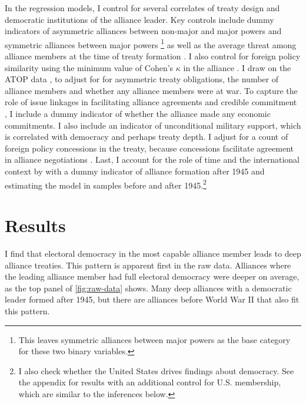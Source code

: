 \documentclass[12pt]{article}
\begin{document}
In the regression models, I control for several correlates of treaty design and democratic institutions of the alliance leader. 
Key controls include dummy indicators of asymmetric alliances between non-major and major powers and symmetric alliances between major powers \citep{Mattes2012}\footnote{This leaves symmetric alliances between major powers as the base category for these two binary variables.} as well as the average threat among alliance members at the time of treaty formation \citep{LeedsSavun2007}. 
I also control for foreign policy similarity using the minimum value of Cohen's $\kappa$ in the alliance \citep{Hage2011}.
I draw on the ATOP data \citep{Leedsetal2002}, to adjust for for asymmetric treaty obligations, the number of alliance members and whether any alliance members were at war. 
To capture the role of issue linkages in facilitating alliance agreements and credible commitment \citep{Poast2012, Poast2013}, I include a dummy indicator of whether the alliance made any economic commitments. 
I also include an indicator of unconditional military support, which is correlated with democracy \citep{Chibaetal2015} and perhaps treaty depth. 
I adjust for a count of foreign policy concessions in the treaty, because concessions facilitate agreement in alliance negotiations \citep{Johnson2015}. 
Last, I account for the role of time and the international context by with a dummy indicator of alliance formation after 1945 and estimating the model in samples before and after 1945.\footnote{I also check whether the United States drives findings about democracy. See the appendix for results with an additional control for U.S. membership, which are similar to the inferences below.}



\section{Results}


I find that electoral democracy in the most capable alliance member leads to deep alliance treaties. 
This pattern is apparent first in the raw data. 
Alliances where the leading alliance member had full electoral democracy were deeper on average, as the top panel of \autoref{fig:raw-data} shows. 
Many deep alliances with a democratic leader formed after 1945, but there are alliances before World War II that also fit this pattern. 
\end{document}
